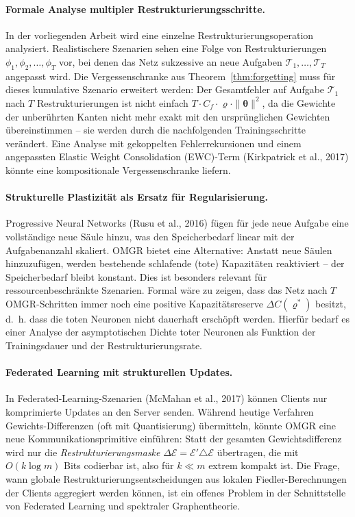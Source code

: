 \documentclass[12pt, a4paper, openany]{report}
\newcommand{\calE}{\mathcal{E}}
\begin{document}
\paragraph{Formale Analyse multipler Restrukturierungsschritte.}
In der vorliegenden Arbeit wird eine einzelne Restrukturierungsoperation
analysiert.  Realistischere Szenarien sehen eine Folge von
Restrukturierungen $\phi_1, \phi_2, \ldots, \phi_T$ vor, bei denen
das Netz sukzessive an neue Aufgaben $\mathcal{T}_1, \ldots, \mathcal{T}_T$
angepasst wird.  Die Vergessenschranke aus Theorem~\ref{thm:forgetting}
muss für dieses kumulative Szenario erweitert werden: Der Gesamtfehler
auf Aufgabe $\mathcal{T}_1$ nach $T$ Restrukturierungen ist nicht
einfach $T \cdot C_f \cdot \varrho \cdot \|\bm{\theta}\|^2$, da die
Gewichte der unberührten Kanten nicht mehr exakt mit den ursprünglichen
Gewichten übereinstimmen -- sie werden durch die nachfolgenden
Trainingsschritte verändert.  Eine Analyse mit gekoppelten
Fehlerrekursionen und einem angepassten Elastic Weight Consolidation
(EWC)-Term (Kirkpatrick et al., 2017) könnte eine kompositionale
Vergessenschranke liefern.

\paragraph{Strukturelle Plastizität als Ersatz für Regularisierung.}
Progressive Neural Networks (Rusu et al., 2016) fügen für jede neue
Aufgabe eine vollständige neue Säule hinzu, was den Speicherbedarf
linear mit der Aufgabenanzahl skaliert.  OMGR bietet eine Alternative:
Anstatt neue Säulen hinzuzufügen, werden bestehende schlafende
(tote) Kapazitäten reaktiviert -- der Speicherbedarf bleibt konstant.
Dies ist besonders relevant für ressourcenbeschränkte Szenarien.
Formal wäre zu zeigen, dass das Netz nach $T$ OMGR-Schritten immer noch
eine positive Kapazitätsreserve $\Delta C(\varrho^*)$ besitzt, d.~h.
dass die toten Neuronen nicht dauerhaft erschöpft werden.  Hierfür
bedarf es einer Analyse der asymptotischen Dichte toter Neuronen als
Funktion der Trainingsdauer und der Restrukturierungsrate.

\paragraph{Federated Learning mit strukturellen Updates.}
In Federated-Learning-Szenarien (McMahan et al., 2017) können Clients
nur komprimierte Updates an den Server senden.  Während heutige Verfahren
Gewichts-Differenzen (oft mit Quantisierung) übermitteln, könnte
OMGR eine neue Kommunikationsprimitive einführen: Statt der gesamten
Gewichtsdifferenz wird nur die \emph{Restrukturierungsmaske}
$\Delta\calE = \calE' \triangle \calE$ übertragen, die mit $O(k \log m)$
Bits codierbar ist, also für $k \ll m$ extrem kompakt ist.
Die Frage, wann globale Restrukturierungsentscheidungen aus lokalen
Fiedler-Berechnungen der Clients aggregiert werden können, ist ein
offenes Problem in der Schnittstelle von Federated Learning und
spektraler Graphentheorie.
\end{document}

